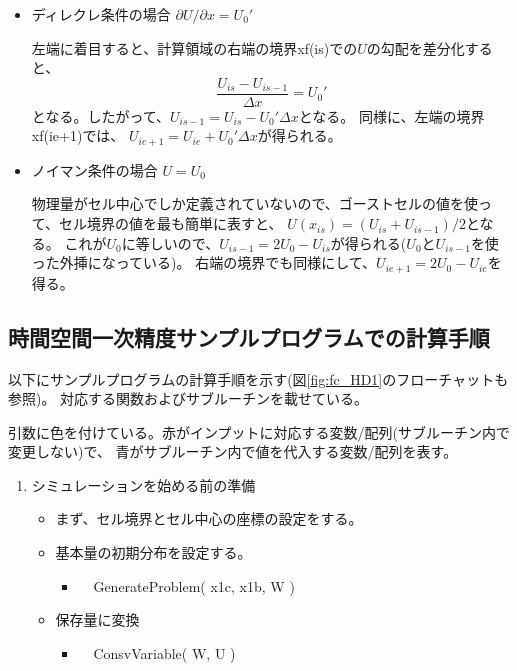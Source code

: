 {\begin{itemize}
    \item ディレクレ条件の場合 $\partial U/\partial x =U_0'$

        左端に着目すると、計算領域の右端の境界{\ttfamily xf(is)}での$U$の勾配を差分化すると、
        \begin{equation}
            \frac{U_{is} - U_{is-1}}{\Delta x} = U_0'
        \end{equation}
    となる。したがって、$U_{is-1} = U_{is} - U_0' \Delta x$となる。
    同様に、左端の境界{\ttfamily xf(ie+1)}では、
    $U_{ie+1} = U_{ie} + U_0' \Delta x$が得られる。

    \item ノイマン条件の場合 $U=U_0$

        物理量がセル中心でしか定義されていないので、ゴーストセルの値を使って、セル境界の値を最も簡単に表すと、
        $U(x_{is})= (U_{is} + U_{is-1})/2$となる。
        これが$U_0$に等しいので、$U_{is-1} = 2U_0 - U_{is}$が得られる($U_0$と$U_{is-1}$を使った外挿になっている)。
        右端の境界でも同様にして、$U_{ie+1} = 2U_0 - U_{ie}$を得る。

\end{itemize}

\subsection{時間空間一次精度サンプルプログラムでの計算手順}

以下にサンプルプログラムの計算手順を示す(図\ref{fig:fc_HD1}のフローチャットも参照)。
対応する関数およびサブルーチンを載せている。

引数に色を付けている。赤がインプットに対応する変数/配列(サブルーチン内で変更しない)で、
青がサブルーチン内で値を代入する変数/配列を表す。

\begin{enumerate} 
     \item シミュレーションを始める前の準備
     \begin{itemize}
        \item まず、セル境界とセル中心の座標の設定をする。
        \begin{itemize}
            \item {\ttfamily　GenerateGrid( {{\color{red}xf, xv} )}
        \end{itemize}
        \item 基本量の初期分布を設定する。
        \begin{itemize}
            \item {\ttfamily　GenerateProblem( {\color{blue} x1c, x1b}, {\color{red} W} )}
        \end{itemize}
        \item 保存量に変換
        \begin{itemize}
            \item {\ttfamily　ConsvVariable( {\color{blue} W}, {\color{red} U} )}
        \end{itemize}
     \end{itemize}


\end{enumerate}}
